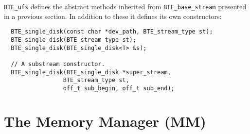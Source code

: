 \verb|BTE_ufs| defines the abstract methods inherited from
\verb|BTE_base_stream| presented in a previous section. In addition to
these it defines its own constructors:
\begin{verbatim}
  BTE_single_disk(const char *dev_path, BTE_stream_type st); 
  BTE_single_disk(BTE_stream_type st); 
  BTE_single_disk(BTE_single_disk<T> &s); 
  
  // A substream constructor.
  BTE_single_disk(BTE_single_disk *super_stream,
                 BTE_stream_type st,
                 off_t sub_begin, off_t sub_end);
\end{verbatim}



\section{The Memory Manager (MM)}
\label{sec:ref-mm}

\tobewritten




